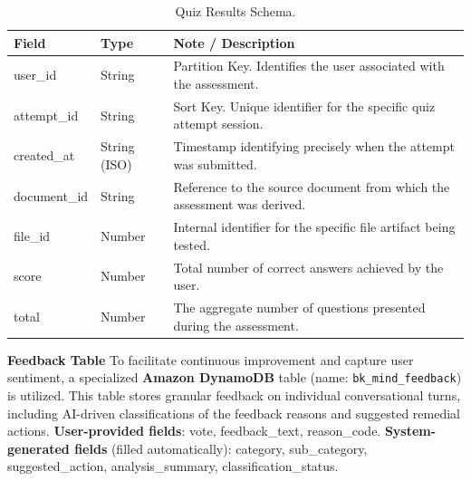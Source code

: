 \begin{table}[H]
    \centering
    \caption{Quiz Results Schema.}
    \label{tab:quiz_results}
    \begin{tabular}{llp{8cm}}
        \toprule
        \textbf{Field} & \textbf{Type} & \textbf{Note / Description} \\
        \midrule
        user\_id & String & Partition Key. Identifies the user associated with the assessment. \\
        attempt\_id & String & Sort Key. Unique identifier for the specific quiz attempt session. \\
        \midrule
        created\_at & String (ISO) & Timestamp identifying precisely when the attempt was submitted. \\
        document\_id & String & Reference to the source document from which the assessment was derived. \\
        file\_id & Number & Internal identifier for the specific file artifact being tested. \\
        score & Number & Total number of correct answers achieved by the user. \\
        total & Number & The aggregate number of questions presented during the assessment. \\
        \bottomrule
    \end{tabular}
\end{table}

\newpage

\textbf{Feedback Table}
To facilitate continuous improvement and capture user sentiment, a specialized \textbf{Amazon DynamoDB} table (name: \texttt{bk\_mind\_feedback}) is utilized. This table stores granular feedback on individual conversational turns, including AI-driven classifications of the feedback reasons and suggested remedial actions.
\textbf{User-provided fields}: vote, feedback\_text, reason\_code. \textbf{System-generated fields} (filled automatically): category, sub\_category, suggested\_action, analysis\_summary, classification\_status.

